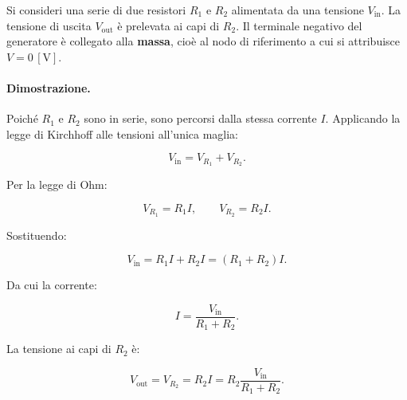 Si consideri una serie di due resistori \(R_1\) e \(R_2\) alimentata da una tensione \(V_{\text{in}}\). La tensione di uscita \(V_{\text{out}}\) è prelevata ai capi di \(R_2\). Il terminale negativo del generatore è collegato alla \textbf{massa}, cioè al nodo di riferimento a cui si attribuisce \(V = 0\,[\text{V}]\).

\begin{center}
\end{center}

\paragraph{Dimostrazione.}
Poiché \(R_1\) e \(R_2\) sono in serie, sono percorsi dalla stessa corrente \(I\). Applicando la legge di Kirchhoff alle tensioni all'unica maglia:

\[
V_{\text{in}} = V_{R_1} + V_{R_2}.
\]

Per la legge di Ohm:

\[
V_{R_1} = R_1 I, \qquad V_{R_2} = R_2 I.
\]

Sostituendo:

\[
V_{\text{in}} = R_1 I + R_2 I = (R_1 + R_2) I.
\]

Da cui la corrente:

\[
I = \frac{V_{\text{in}}}{R_1 + R_2}.
\]

La tensione ai capi di \(R_2\) è:

\[
V_{\text{out}} = V_{R_2} = R_2 I = R_2 \frac{V_{\text{in}}}{R_1 + R_2}.
\]

